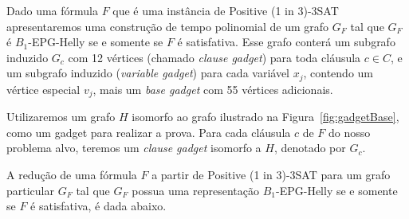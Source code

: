 Dado uma fórmula  $F$ que é uma instância de {\sc Positive (1 in 3)-3SAT} apresentaremos uma construção de tempo polinomial de um grafo $ G_F$ tal que  $ G_F $ é $ B_1$-EPG-Helly se e somente se $ F $ é satisfativa. Esse grafo conterá um subgrafo induzido  $ G_c$ com 12 vértices (chamado \emph {clause gadget}) para toda cláusula $ c \in C $, e um subgrafo induzido (\emph {variable gadget}) para cada variável $ x_j$, contendo um vértice especial   $ v_j$, mais um \emph{base gadget}  com 55 vértices adicionais.

Utilizaremos um grafo $H$ isomorfo ao grafo ilustrado na Figura~\ref{fig:gadgetBase}, como um  gadget para realizar a prova. Para cada cláusula  $c$ de $F$ do nosso problema alvo, teremos um \emph{clause gadget} isomorfo a $H$, denotado por $G_c$. %

 


A redução  de uma fórmula $F$ a partir de  {\sc Positive (1 in 3)-3SAT}  para um grafo particular $G_F$ tal que $G_F$ possua uma representação $B_{1}$-EPG-Helly se e somente se $F$ é satisfativa, é dada abaixo.

